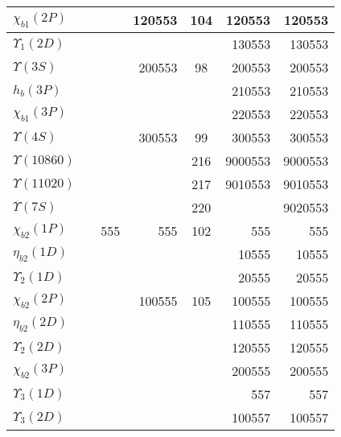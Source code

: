 \begin{tabular}{|l@{\tstrut}|r|r|r|c|r|r|}
$\chi_{b1}(2P)$                &     &         & 120553 & 104 &  120553 & 120553 \\ \hline
$\Upsilon_1(2D)$               &     &         &        &     &  130553 & 130553 \\ \hline
$\Upsilon(3S)$                 &     &         & 200553 &  98 &  200553 & 200553 \\ \hline
$h_b(3P)$                      &     &         &        &     &  210553 & 210553 \\ \hline
$\chi_{b1}(3P)$                &     &         &        &     &  220553 & 220553 \\ \hline
$\Upsilon(4S)$                 &     &         & 300553 &  99 &  300553 & 300553 \\ \hline
$\Upsilon(10860)$              &     &         &        & 216 & 9000553 & 9000553 \\ \hline
$\Upsilon(11020)$              &     &         &        & 217 & 9010553 & 9010553 \\ \hline
$\Upsilon(7S)$                 &     &         &        & 220 &         & 9020553 \\ \hline\hline
$\chi_{b2}(1P)$                &     &   555   &    555 & 102 &     555 & 555 \\ \hline
$\eta_{b2}(1D)$                &     &         &        &     &   10555 & 10555 \\ \hline
$\Upsilon_2(1D)$               &     &         &        &     &   20555 & 20555 \\ \hline
$\chi_{b2}(2P)$                &     &         & 100555 & 105 &  100555 & 100555 \\ \hline
$\eta_{b2}(2D)$                &     &         &        &     &  110555 & 110555 \\ \hline
$\Upsilon_2(2D)$               &     &         &        &     &  120555 & 120555 \\ \hline
$\chi_{b2}(3P)$                &     &         &        &     &  200555 & 200555 \\ \hline\hline
$\Upsilon_3(1D)$               &     &         &        &     &     557 & 557 \\ \hline
$\Upsilon_3(2D)$               &     &         &        &     &  100557 & 100557 \\ \hline
\end{tabular}

